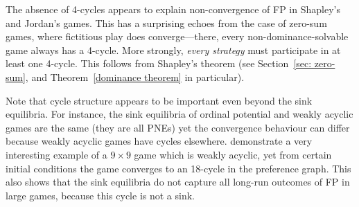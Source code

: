 \documentclass[preprint,authoryear]{elsarticle}
\begin{document}

The absence of 4-cycles appears to explain non-convergence of FP in Shapley's and Jordan's games. This has a surprising echoes from the case of zero-sum games, where fictitious play does converge---there, every non-dominance-solvable game always has a 4-cycle. More strongly, \emph{every strategy} must participate in at least one 4-cycle. This follows from Shapley's theorem \citep{shapley_topics_1964} (see Section~\ref{sec: zero-sum}, and Theorem~\ref{dominance theorem} in particular).


Note that cycle structure appears to be important even beyond the sink equilibria. For instance, the sink equilibria of ordinal potential and weakly acyclic games are the same (they are all PNEs) yet the convergence behaviour can differ because weakly acyclic games have cycles elsewhere. \cite{foster_nonconvergence_1998} demonstrate a very interesting example of a $9\times 9$ game which is weakly acyclic, yet from certain initial conditions the game converges to an 18-cycle in the preference graph. This also shows that the sink equilibria do not capture all long-run outcomes of FP in large games, because this cycle is not a sink. 
\end{document}
